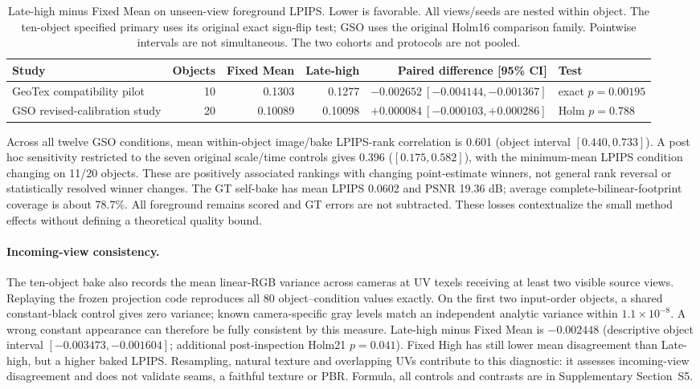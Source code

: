 \documentclass[times,twocolumn,final]{elsarticle}
\begin{document}
\begin{table}[t]\centering\scriptsize\setlength{\tabcolsep}{4pt}
\caption{Late-high minus Fixed Mean on unseen-view foreground LPIPS. Lower is favorable. All views/seeds are nested within object. The ten-object specified primary uses its original exact sign-flip test; GSO uses the original Holm16 comparison family. Pointwise intervals are not simultaneous. The two cohorts and protocols are not pooled.}
\label{tab:bake-cohorts}
\begin{tabular}{lrrrrl}
\toprule Study & Objects & Fixed Mean & Late-high & Paired difference [95\% CI] & Test \\
\midrule
GeoTex compatibility pilot & 10 & 0.1303 & 0.1277 & $-0.002652\ [-0.004144,-0.001367]$ & exact $p=0.00195$ \\
GSO revised-calibration study & 20 & 0.10089 & 0.10098 & $+0.000084\ [-0.000103,+0.000286]$ & Holm $p=0.788$ \\
\bottomrule\end{tabular}\end{table}

Across all twelve GSO conditions, mean within-object image/bake LPIPS-rank correlation is 0.601 (object interval $[0.440,0.733]$). A post hoc sensitivity restricted to the seven original scale/time controls gives 0.396 ($[0.175,0.582]$), with the minimum-mean LPIPS condition changing on 11/20 objects. These are positively associated rankings with changing point-estimate winners, not general rank reversal or statistically resolved winner changes. The GT self-bake has mean LPIPS 0.0602 and PSNR 19.36 dB; average complete-bilinear-footprint coverage is about 78.7\%. All foreground remains scored and GT errors are not subtracted. These losses contextualize the small method effects without defining a theoretical quality bound.

\paragraph{Incoming-view consistency.}
The ten-object bake also records the mean linear-RGB variance across cameras at UV texels receiving at least two visible source views. Replaying the frozen projection code reproduces all 80 object--condition values exactly. On the first two input-order objects, a shared constant-black control gives zero variance; known camera-specific gray levels match an independent analytic variance within $1.1\times10^{-8}$. A wrong constant appearance can therefore be fully consistent by this measure. Late-high minus Fixed Mean is $-0.002448$ (descriptive object interval $[-0.003473,-0.001604]$; additional post-inspection Holm21 $p=0.041$). Fixed High has still lower mean disagreement than Late-high, but a higher baked LPIPS. Resampling, natural texture and overlapping UVs contribute to this diagnostic: it assesses incoming-view disagreement and does not validate seams, a faithful texture or PBR. Formula, all controls and contrasts are in Supplementary Section~S5.
\end{document}
